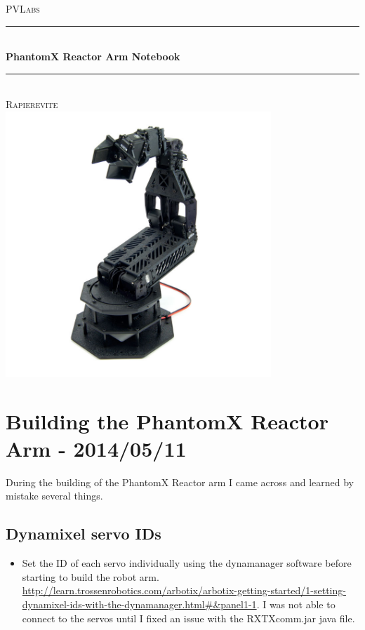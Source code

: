 \documentclass[letterpaper, 10 pt]{article}
\begin{document}
\begin{titlepage}
\center
\textsc{\LARGE PVLabs}\\[1.5cm]

\rule{\linewidth}{0.5mm}\\[0.4cm]
{\huge \bfseries PhantomX Reactor Arm Notebook}\\[0.4cm]
\rule{\linewidth}{0.5mm}\\[1.5cm]
\textsc{\normalsize Rapierevite}\\[1.5cm]
\includegraphics[width=10.0cm]{resources/phantomx-reactor}
\vfill
\end{titlepage}

\tableofcontents
\newpage



\section{Building the PhantomX Reactor Arm - 2014/05/11}
During the building of the PhantomX Reactor arm I came across and learned by mistake several things.
  \subsection{Dynamixel servo IDs}
    \begin{itemize}
    \item Set the ID of each servo individually using the dynamanager software before starting to build the robot arm. \url{http://learn.trossenrobotics.com/arbotix/arbotix-getting-started/1-setting-dynamixel-ids-with-the-dynamanager.html#&panel1-1}. I was not able to connect to the servos until I fixed an issue with the RXTXcomm.jar java file.
    \end{itemize}
\end{document}

